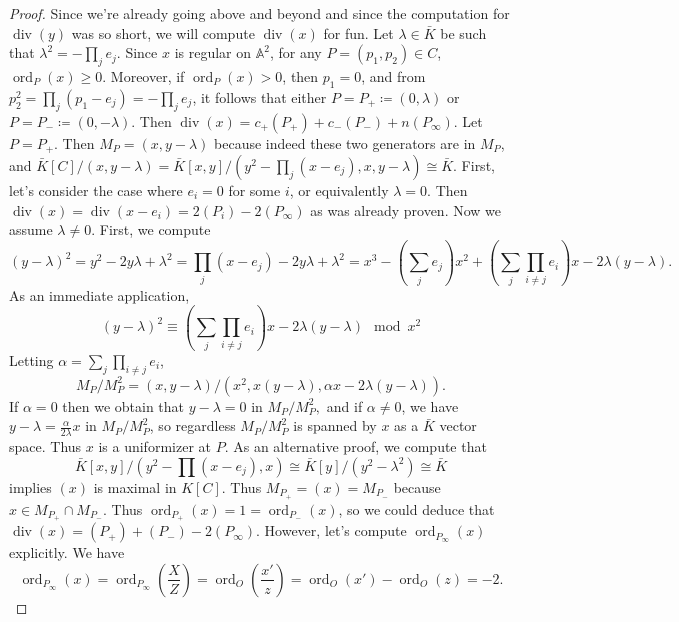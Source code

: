 \documentclass{article}
\theoremstyle{customplain}
\theoremstyle{customdef}
\renewcommand{\div}{\mathop{\mathrm{div}}}
\newcommand{\A}{\mathbb{A}}
\DeclareMathOperator{\ord}{ord}
\theoremstyle{definition} %
\renewcommand{\ge}{\geqslant}
\begin{document}
\begin{proof}
    Since we're already going above and beyond and since the computation for $\div(y)$ was so short, we will compute $\div(x)$ for fun. Let $\lambda \in \bar K$ be such that $\lambda^2 = -\prod_j e_j.$ Since $x$ is regular on $\A^2$, for any $P=(p_1, p_2)\in C$, $\ord_P(x)\ge 0.$ Moreover, if $\ord_P(x)>0$, then $p_1=0$, and from $p_2^2=\prod_j(p_1-e_j)=-\prod_j e_j$, it follows that either $P=P_+\coloneqq (0, \lambda)$ or $P=P_-\coloneqq (0, -\lambda).$ Then $\div(x)=c_+ (P_+)+c_-(P_-)+n(P_\infty).$ Let $P=P_+$. Then $M_P=(x,y-\lambda)$ because indeed these two generators are in $M_P$, and $\bar K[C]/(x,y-\lambda)=\bar K[x,y]/(y^2-\prod_j(x-e_j), x, y-\lambda)\cong \bar K$. First, let's consider the case where $e_i=0$ for some $i$, or equivalently $\lambda = 0.$ Then $\div(x)=\div(x-e_i)=2(P_i)-2(P_\infty)$ as was already proven. Now we assume $\lambda \ne 0.$ First, we compute
    \[
    (y-\lambda)^2=y^2-2y\lambda+\lambda^2=\prod_j(x-e_j)-2y\lambda+\lambda^2 = x^3-(\sum_j e_j)x^2+(\sum_j \prod_{i\ne j} e_i)x-2\lambda(y-\lambda).
    \]
    As an immediate application,
    \[
    (y-\lambda)^2 \equiv (\sum_j \prod_{i\ne j} e_i)x-2\lambda(y-\lambda) \mod x^2
    \]
    Letting $\alpha =\sum_j \prod_{i\ne j} e_i$,
    \[
    M_P/M_P^2 = (x,y-\lambda)/(x^2,x(y-\lambda), \alpha x-2\lambda(y-\lambda)).
    \]
    If $\alpha = 0$ then we obtain that $y-\lambda = 0$ in $M_P/M_P^2,$ and if $\alpha \ne 0$, we have $y-\lambda = \frac{\alpha}{2\lambda} x$ in $M_P/M_P^2$, so regardless $M_P/M_P^2$ is spanned by $x$ as a $\bar K$ vector space. Thus $x$ is a uniformizer at $P.$ As an alternative proof, we compute that 
    \[
    \bar K[x,y]/(y^2-\prod(x-e_j),x)\cong \bar K[y]/(y^2-\lambda^2) \cong \bar K
    \]
    implies $(x)$ is maximal in $K[C]$. Thus $M_{P_+}=(x)=M_{P_-}$ because $x\in M_{P_+}\cap M_{P_-}.$ Thus $\ord_{P_+}(x)=1=\ord_{P_-}(x)$, so we could deduce that $\div(x)=(P_+)+(P_-)-2(P_\infty).$ However, let's compute $\ord_{P_\infty}(x)$ explicitly. We have
    \[
    \ord_{P_\infty}(x)=\ord_{P_\infty}(\frac{X}{Z})=\ord_O(\frac{x'}{z})=\ord_O(x')-\ord_O(z)=-2.
    \]
\end{proof}
\end{document}
